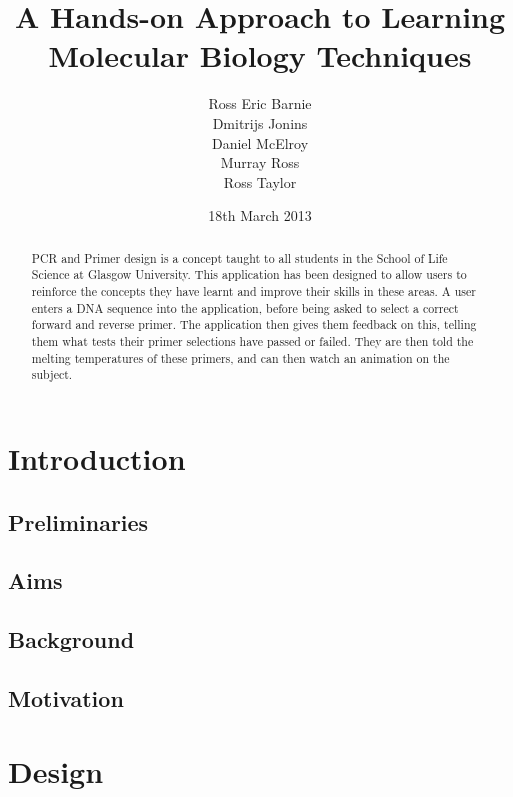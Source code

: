 \documentclass{l3proj}
\title{A Hands-on Approach to Learning Molecular Biology Techniques}
\author{
  Ross Eric Barnie \\
  Dmitrijs Jonins \\
  Daniel McElroy \\
  Murray Ross \\
  Ross Taylor
}
\date{18th March 2013}
\begin{document}
\maketitle
\begin{abstract}

PCR and Primer design is a concept taught to all students in the School of Life Science at Glasgow
University. This application has been designed to allow users to reinforce the concepts they have
learnt and improve their skills in these areas. A user enters a DNA sequence into the application,
before being asked to select a correct forward and reverse primer. The application then gives them
feedback on this, telling them what tests their primer selections have passed or failed. They are then
told the melting temperatures of these primers, and can then watch an animation on the subject.

\end{abstract}

\educationalconsent
\tableofcontents

\chapter{Introduction}
\label{intro}

\section{Preliminaries}
\label{intro:prelims}


\section{Aims}
\label{intro:aims}


\section{Background}
\label{intro:background}

\section{Motivation}
\label{intro:motiv}


\chapter{Design}
\label{design}
\end{document}
